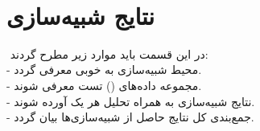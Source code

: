 ‎\section{نتایج شبیه‌سازی}‎
در این قسمت باید موارد زیر مطرح گردند:\\ 
- محیط شبیه‌سازی به خوبی معرفی گردد.\\
- مجموعه داده‌های () تست معرفی شوند.\\
- نتایج شبیه‌سازی به همراه تحلیل هر یک آورده شوند.\\
- جمع‌بندی کل نتایج حاصل از شبیه‌سازی‌ها بیان گردد. 